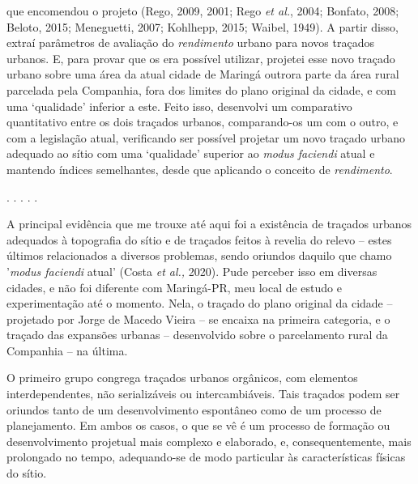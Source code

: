 \documentclass[]{report}
\begin{document}
	que encomendou o projeto (Rego, 2009, 2001; Rego \textit{et al.}, 2004; Bonfato, 2008; Beloto, 2015; Meneguetti, 2007; Kohlhepp, 2015; Waibel, 1949). A partir disso, extraí parâmetros de avaliação do \textit{rendimento} urbano para novos traçados urbanos. E, para provar que os era possível utilizar, projetei esse novo traçado urbano sobre uma área da atual cidade de Maringá outrora parte da área rural parcelada pela Companhia, fora dos limites do plano original da cidade, e com uma `qualidade' inferior a este. Feito isso, desenvolvi um comparativo quantitativo entre os dois traçados urbanos, comparando-os um com o outro, e com a legislação atual, verificando ser possível projetar um novo traçado urbano adequado ao sítio com uma `qualidade' superior ao \textit{modus faciendi} atual e mantendo índices semelhantes, desde que aplicando o conceito de \textit{rendimento}.

	\begin{center}
		. . . . .
	\end{center}

	A principal evidência que me trouxe até aqui foi a existência de traçados urbanos adequados à topografia do sítio e de traçados feitos à revelia do relevo – estes últimos relacionados a diversos problemas, sendo oriundos daquilo que chamo '\textit{modus faciendi} atual' (Costa \textit{et al.,} 2020). Pude perceber isso em diversas cidades, e não foi diferente com Maringá-PR, meu local de estudo e experimentação até o momento. Nela, o traçado do plano original da cidade – projetado por Jorge de Macedo Vieira – se encaixa na primeira categoria, e o traçado das expansões urbanas – desenvolvido sobre o parcelamento rural da Companhia – na última. 

	O primeiro grupo congrega traçados urbanos orgânicos, com elementos interdependentes, não serializáveis ou intercambiáveis. Tais traçados podem ser oriundos tanto de um desenvolvimento espontâneo como de um processo de planejamento. Em ambos os casos, o que se vê é um processo de formação ou desenvolvimento projetual mais complexo e elaborado, e, consequentemente, mais prolongado no tempo, adequando-se de modo particular às características físicas do sítio. 
\end{document}
